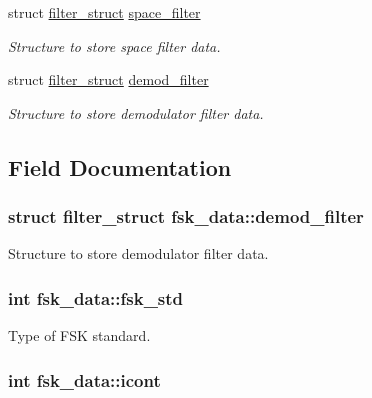 \begin{DoxyCompactItemize}
struct \hyperlink{structfilter__struct}{filter\+\_\+struct} \hyperlink{structfsk__data_afd5f314e1cf00a63eaacfa7abd3b9205}{space\+\_\+filter}
\begin{DoxyCompactList}\small\item\em Structure to store space filter data. \end{DoxyCompactList}\item 
struct \hyperlink{structfilter__struct}{filter\+\_\+struct} \hyperlink{structfsk__data_a21b94a212cda51b7b465299f2dd1e0c2}{demod\+\_\+filter}
\begin{DoxyCompactList}\small\item\em Structure to store demodulator filter data. \end{DoxyCompactList}\end{DoxyCompactItemize}


\subsection{Field Documentation}
\hypertarget{structfsk__data_a21b94a212cda51b7b465299f2dd1e0c2}{}
\subsubsection[{demod\+\_\+filter}]{\setlength{\rightskip}{0pt plus 5cm}struct {\bf filter\+\_\+struct} fsk\+\_\+data\+::demod\+\_\+filter}\label{structfsk__data_a21b94a212cda51b7b465299f2dd1e0c2}


Structure to store demodulator filter data. 

\hypertarget{structfsk__data_a25f81eef1df67e4aa9e1e89b1df30ad9}{}
\subsubsection[{fsk\+\_\+std}]{\setlength{\rightskip}{0pt plus 5cm}int fsk\+\_\+data\+::fsk\+\_\+std}\label{structfsk__data_a25f81eef1df67e4aa9e1e89b1df30ad9}


Type of F\+S\+K standard. 

\hypertarget{structfsk__data_a072af15b1e767960389e117cbc4dfee9}{}
\subsubsection[{icont}]{\setlength{\rightskip}{0pt plus 5cm}int fsk\+\_\+data\+::icont}\label{structfsk__data_a072af15b1e767960389e117cbc4dfee9}


